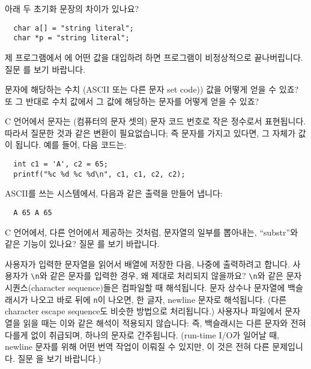 \begin{faq}
	아래 두 초기화 문장의 차이가 있나요?
\begin{verbatim}
  char a[] = "string literal";
  char *p = "string literal";
\end{verbatim}
	\noindent 제 프로그램에서 에 어떤 값을 대입하려 하면
        프로그램이 비정상적으로 끝나버립니다.
\A
	질문 를 보기 바랍니다.
\end{faq}

\begin{faq}
	문자에 해당하는 수치 (ASCII 또는 다른 문자 set code)) 값을
        어떻게 얻을 수 있죠?
	또 그 반대로 수치 값에서 그 값에 해당하는 문자를 어떻게 얻을 수 있죠?

\A
	C 언어에서 문자는 (컴퓨터의 문자 셋의) 문자 코드 번호로 작은
	정수로서 표현됩니다.  따라서 질문한 것과 같은 변환이 필요없습니다;
	즉 문자를 가지고 있다면, 그 자체가 값이 됩니다. 예를 들어, 다음 코드는:
\begin{verbatim}
  int c1 = 'A', c2 = 65;
  printf("%c %d %c %d\n", c1, c1, c2, c2);
\end{verbatim}
	ASCII를 쓰는 시스템에서, 다음과 같은 출력을 만들어 냅니다:
\begin{verbatim}
  A 65 A 65
\end{verbatim}
	\noindent {}
\end{faq}

\begin{faq}
	C 언어에서, 다른 언어에서 제공하는 것처럼, 문자열의 일부를 뽑아내는,
        ``substr''와 같은 기능이 있나요?
\A
	질문 를 보기 바랍니다.
\end{faq}

\begin{faq}
	사용자가 입력한 문자열을 읽어서 배열에 저장한 다음, 나중에 출력하려고
        합니다. 사용자가 \verb+\n+와 같은 문자를 입력한 경우, 왜 제대로
        처리되지 않을까요?
\A
	\verb+\n+와 같은 문자 시퀀스(character sequence)들은 컴파일할 때
        해석됩니다. 문자 상수나 문자열에 백슬래시가 나오고 바로 뒤에 
        \verb+n+이 나오면, 한 글자, newline 문자로 해석됩니다. 
        (다른 character escape sequence도 비슷한 방법으로 처리됩니다.)
        사용자나 파일에서 문자열을 읽을 때는 이와 같은 해석이 적용되지 않습니다:
        즉, 백슬래시는 다른 문자와 전혀 다를게 없이 취급되며, 하나의 문자로
        간주됩니다. (run-time I/O가 일어날 때, newline 문자를 위해 어떤
        번역 작업이 이뤄질 수 있지만, 이 것은 전혀 다른 문제입니다. 질문
        을 보기 바랍니다.) 
\end{faq}

